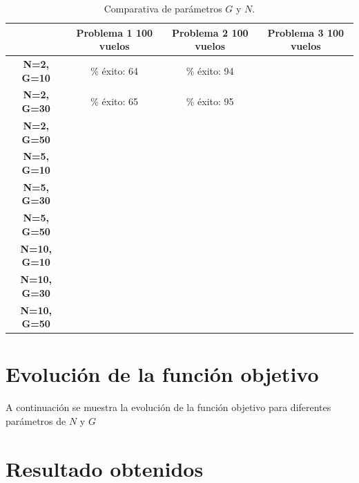 \begin{table}[htbp]
	\centering
	\caption{Comparativa de parámetros $G$ y $N$.}
	\label{fig: comparativa de parámetros $G$ y $N$.}
\begin{tabular}{|c|c|c|c|}
	\hline
	& \textbf{Problema 1
		100 vuelos} & \textbf{Problema 2
		100 vuelos} & \textbf{Problema 3
		100 vuelos} \\ \hline
	\textbf{N=2, G=10} & \% éxito: 64 & \% éxito: 94 &  \\ \hline
	\textbf{N=2, G=30} & \% éxito: 65 & \% éxito: 95 &  \\ \hline
	\textbf{N=2, G=50} &  &  &  \\ \hline
	\textbf{N=5, G=10} &  &  &  \\ \hline
	\textbf{N=5, G=30} &  &  &  \\ \hline
	\textbf{N=5, G=50} &  &  &  \\ \hline
	\textbf{N=10, G=10} &  &  &  \\ \hline
	\textbf{N=10, G=30} &  &  &  \\ \hline
	\textbf{N=10, G=50} &  &  &  \\ \hline
\end{tabular}
	
\end{table}

\section{Evolución de la función objetivo}
A continuación se muestra la evolución de la función objetivo para diferentes parámetros de $N$ y $G$
\section{Resultado obtenidos}


